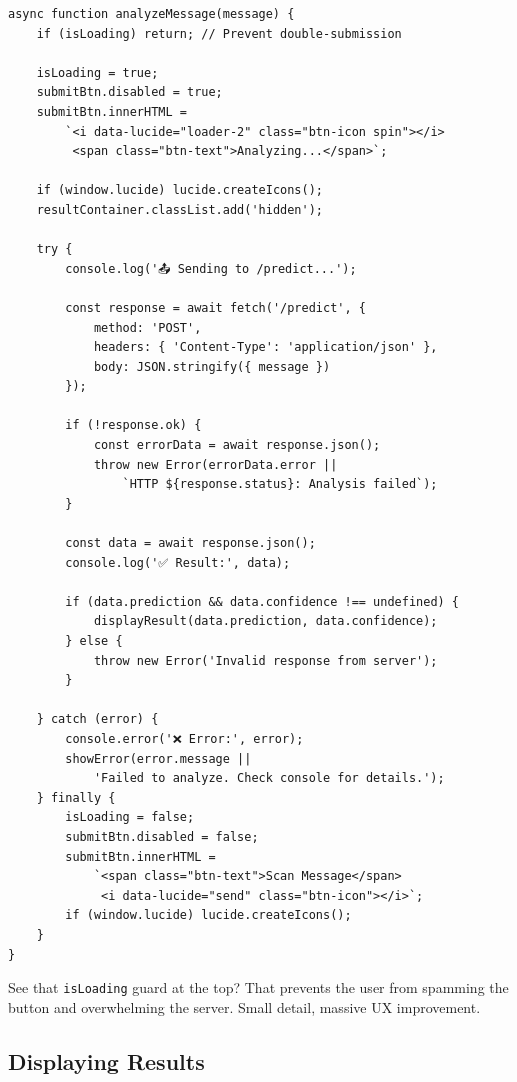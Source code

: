 \documentclass[12pt, a4paper]{article}
\begin{document}
\begin{verbatim}
async function analyzeMessage(message) {
    if (isLoading) return; // Prevent double-submission
    
    isLoading = true;
    submitBtn.disabled = true;
    submitBtn.innerHTML = 
        `<i data-lucide="loader-2" class="btn-icon spin"></i> 
         <span class="btn-text">Analyzing...</span>`;
    
    if (window.lucide) lucide.createIcons();
    resultContainer.classList.add('hidden');
    
    try {
        console.log('📤 Sending to /predict...');
        
        const response = await fetch('/predict', {
            method: 'POST',
            headers: { 'Content-Type': 'application/json' },
            body: JSON.stringify({ message })
        });
        
        if (!response.ok) {
            const errorData = await response.json();
            throw new Error(errorData.error || 
                `HTTP ${response.status}: Analysis failed`);
        }
        
        const data = await response.json();
        console.log('✅ Result:', data);
        
        if (data.prediction && data.confidence !== undefined) {
            displayResult(data.prediction, data.confidence);
        } else {
            throw new Error('Invalid response from server');
        }
        
    } catch (error) {
        console.error('❌ Error:', error);
        showError(error.message || 
            'Failed to analyze. Check console for details.');
    } finally {
        isLoading = false;
        submitBtn.disabled = false;
        submitBtn.innerHTML = 
            `<span class="btn-text">Scan Message</span> 
             <i data-lucide="send" class="btn-icon"></i>`;
        if (window.lucide) lucide.createIcons();
    }
}
\end{verbatim}

\begin{highlight}
    See that \texttt{isLoading} guard at the top? That prevents the user from spamming the button and overwhelming the server. Small detail, massive UX improvement.
\end{highlight}

\subsection{Displaying Results}
\end{document}
